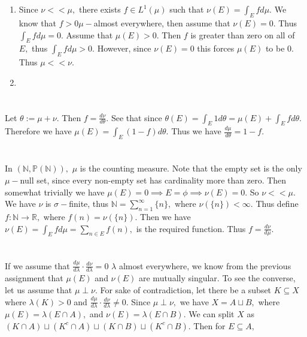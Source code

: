 \documentclass{article}
\begin{document}
\section{} %
\begin{enumerate}
	\item Since $\nu << \mu,$ there exists $f \in L^1(\mu)$ such that $\nu(E)=\int_E f d\mu.$ We know that $f>0 \mu-$almost everywhere, then assume that 
	$\nu(E)=0.$ Thus $\int_{E}f d\mu=0.$ Assume that $\mu(E)>0.$ Then $f$ is greater than zero on all of $E,$ thus $\int_E f d\mu > 0.$ However, since 
	$\nu(E)=0$ this forces $\mu(E)$ to be $0.$ Thus $\mu << \nu.$
	
	\item 
\end{enumerate}
\section{} %
Let $\theta:= \mu + \nu.$ Then $f=\frac{d\nu}{d\theta}.$ See that since $\theta(E)=\int_{E}1 d\theta= \mu(E)+ \int_{E} f d\theta.$ Therefore we have 
$\mu(E)=\int_{E}(1-f)d\theta.$ Thus we have $\frac{d\mu}{d\theta}=1-f.$  
\section{} %
In $(\mathbb{N},\mathbb{P(N)}),$ $\mu$ is the counting measure. Note that the empty set is the only $\mu-$null set, since every non-empty set has 
cardinality more than zero. Then somewhat trivially we have $\mu(E)=0 \implies E=\phi \implies \nu(E)=0.$ So $\nu << \mu.$ We have $\nu$ is $\sigma-$finite, 
thus $\mathbb{N}=\sum_{n=1}^{\infty}\{n\},$ where $\nu(\{n\})<\infty.$ Thus define $f: \mathbb{N} \rightarrow \mathbb{R},$ where $f(n)=\nu(\{n\}).$ Then we 
have $\nu(E)=\int_E f d\mu=\sum_{n \in E}f(n),$ is the required function. Thus $f=\frac{d\nu}{d\mu}.$
\section{} %
If we assume that $\frac{d\mu}{d\lambda}\cdot \frac{d\nu}{d\lambda}=0$ $\lambda$ almost everywhere, we know from the previous assignment that $\mu(E)$ and 
$\nu(E)$ are mutually singular. To see the converse, let us assume that $\mu \perp \nu.$ For sake of contradiction, let there be a subset $K \subseteq X$ 
where $\lambda(K)>0$ and $\frac{d\mu}{d\lambda}\cdot \frac{d\nu}{d\lambda} \neq 0.$ Since $\mu \perp \nu,$ we have $X = A \sqcup B,$
where $\mu(E)=\lambda(E \cap A),$ and $\nu(E)=\lambda(E \cap B).$ We can split $X$ as $(K\cap A)\sqcup (K^c \cap A) \sqcup (K \cap B) \sqcup (K^c \cap B).$ 
Then for $E \subseteq A,$   
\end{document}
